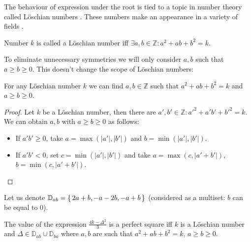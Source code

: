 The behaviour of expression under the root is tied to a topic in number theory called Löschian numbers \cite{marshall1975loschian,oeisA003136}. These numbers make an appearance in a variety of fields \cite{losch1954economics,donovan2016distributive,stannard1995virus}.

\begin{definition}
	\label{v3:def:loeschian}
	Number $k$ is called a Löschian number iff $\exists a,b \in \mathbb Z \colon a^2+ab+b^2=k$.
\end{definition}

To eliminate unnecessary symmetries we will only consider $a,b$ such that $a \geq b \geq 0$. This doesn't change the scope of Löschian numbers:

\begin{lemma}
	\label{v3:lemma:loeschian}
	For any Löschian number $k$ we can find $a,b \in \mathbb Z$ such that $a^2+ab+b^2=k$ and $a \geq b \geq 0$.
\end{lemma}

\begin{proof}
	Let $k$ be a Löschian number, then there are $a',b'\in\mathbb Z\colon a'^2+a'b'+b'^2=k$. We can obtain $a,b$ with $a \geq b \geq 0$ as follows:
	\begin{itemize}
		\item If $a'b' \geq 0$, take $a=\max(|a'|,|b'|)$ and $b=\min(|a'|,|b'|)$.
		\item If $a'b'<0$, set $c = \min(|a'|, |b'|)$ and take $a=\max(c,|a'+b'|)$, $b=\min(c, |a'+b'|)$.
	\end{itemize}
\end{proof}

Let us denote $\mathbb D_{ab} = \set{2a+b, -a-2b, -a+b}$ (considered as a multiset: $b$ can be equal to 0).


\begin{lemma}
	\label{v3:lemma:square}
	The value of the expression $\frac{4k-\Delta^2}{3}$ is a perfect square iff $k$ is a Löschian number and $\Delta\in \mathbb D_{ab} \cup \mathbb D_{ba}$ where $a,b$ are such that $a^2+ab+b^2=k$, $a \geq b \geq 0$.
\end{lemma}

